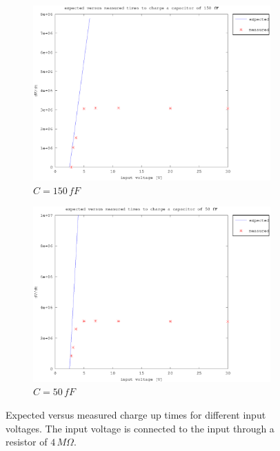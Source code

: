 \documentclass{article}
\begin{document}
\begin{figure}[h]
\begin{subfigure}[b]{0.475\textwidth}
	    \centering 
	    \includegraphics[width=\textwidth]{fig/bre_vin_vs_time_sat_150fF.eps}
	    \caption[]%
	    {$C=150\,fF$}    
	    \label{fig:bre_e_vs_m_150fF}
	\end{subfigure}
	\quad
	\begin{subfigure}[b]{0.475\textwidth}   
	    \centering 
	    \includegraphics[width=\textwidth]{fig/bre_vin_vs_time_sat_50fF.eps}
	    \caption[]%
	    {$C=50\,fF$}    
	    \label{fig:bre_e_vs_m_50fF}
	\end{subfigure}
	\caption{Expected versus measured charge up times for different input voltages. The input voltage is connected to the input through a resistor of $4\,M\Omega$.}
	\label{fig:bre_e_vs_m}
\end{figure}
\end{document}
